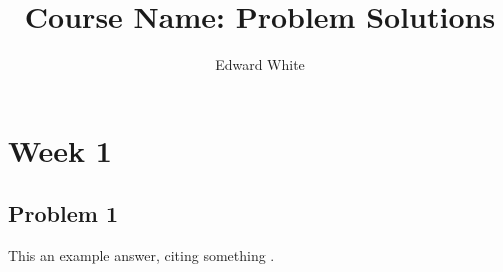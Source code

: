 \documentclass{article}
\title{Course Name: Problem Solutions}
\author{Edward White}
\theoremstyle{plain}
\theoremstyle{definition}
\begin{document}
\maketitle

\section*{Week 1}

\subsection*{Problem 1}

This an example answer, citing something \cite{resnick2019probability}.



\end{document}
